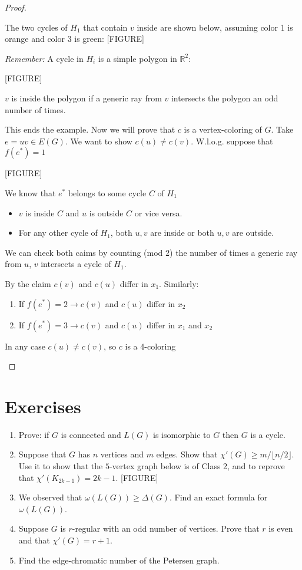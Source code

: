 \begin{proof}
\begin{itemize}
The two cycles of $H_1$ that contain $v$ inside are shown below, assuming color 1 is orange and color 3 is green:
[FIGURE]

    \emph{Remember:} A cycle in $H_i$ is a simple polygon in $\mathbb{R}^2$:
    
[FIGURE]

    $v$ is inside the polygon if a generic ray from $v$ intersects the polygon an odd number of times.
    
    This ends the example. Now we will prove that $c$ is a vertex-coloring of $G$. Take $e=uv\in E(G)$. We want to show $c(u)\neq c(v)$. W.l.o.g. suppose that $f(e^*)=1$
    

[FIGURE]

We know that $e^*$ belongs to some cycle $C$ of $H_1$
    \begin{itemize}
        \item $v$ is inside $C$ and $u$ is outside $C$ or vice versa.
        \item For any other cycle of $H_1$, both $u,v$ are inside or both $u,v$ are outside.
    \end{itemize}
    We can check both caims by counting (mod $2$) the number of times a generic ray from $u$, $v$ intersects a cycle of $H_1$.
    
    By the claim $c(v)$ and $c(u)$ differ in $x_1$. Similarly:
    \begin{enumerate}
        \item[]If $f(e^*)= 2 \rightarrow c(v)$ and $c(u)$ differ in $x_2$
        \item[]If $f(e^*)= 3 \rightarrow c(v)$ and $c(u)$ differ in $x_1$ and $x_2$
    \end{enumerate}
    In any case $c(u)\neq c(v)$, so $c$ is a 4-coloring
\end{itemize}
\end{proof}



\section{Exercises}

\begin{enumerate}
\item Prove: if $G$ is connected and $L(G)$ is isomorphic to $G$ then $G$ is a cycle.
\item Suppose that $G$ has $n$ vertices and $m$ edges. Show that $\chi'(G)\geq m/\lfloor n/2\rfloor$. Use it to show that the $5$-vertex graph below is of Class 2, and to reprove that $\chi'(K_{2k-1})=2k-1$. [FIGURE]
\item We observed that $\omega(L(G))\geq\Delta(G)$. Find an exact formula for $\omega(L(G))$.
\item Suppose $G$ is $r$-regular with an odd number of vertices. Prove that $r$ is even and that $\chi'(G)=r+1$.
\item Find the edge-chromatic number of the Petersen graph.
\end{enumerate}
